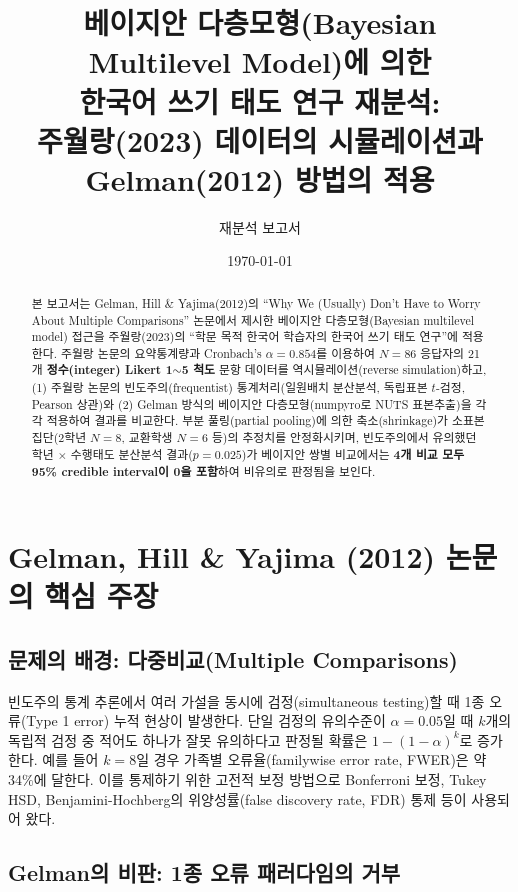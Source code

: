 \documentclass[11pt]{article}
\title{\textbf{베이지안 다층모형(Bayesian Multilevel Model)에 의한\\
한국어 쓰기 태도 연구 재분석:\\
주월랑(2023) 데이터의 시뮬레이션과 Gelman(2012) 방법의 적용}}
\author{재분석 보고서}
\date{\today}
\begin{document}
\maketitle

\begin{abstract}
\noindent
본 보고서는 Gelman, Hill \& Yajima(2012)의 ``Why We (Usually) Don't Have to Worry About Multiple Comparisons'' 논문에서 제시한 베이지안 다층모형(Bayesian multilevel model) 접근을 주월랑(2023)의 ``학문 목적 한국어 학습자의 한국어 쓰기 태도 연구''에 적용한다. 주월랑 논문의 요약통계량과 Cronbach's $\alpha=0.854$를 이용하여 $N=86$ 응답자의 21개 \textbf{정수(integer) Likert 1$\sim$5 척도} 문항 데이터를 역시뮬레이션(reverse simulation)하고, (1) 주월랑 논문의 빈도주의(frequentist) 통계처리(일원배치 분산분석, 독립표본 $t$-검정, Pearson 상관)와 (2) Gelman 방식의 베이지안 다층모형(numpyro로 NUTS 표본추출)을 각각 적용하여 결과를 비교한다. 부분 풀링(partial pooling)에 의한 축소(shrinkage)가 소표본 집단(2학년 $N=8$, 교환학생 $N=6$ 등)의 추정치를 안정화시키며, 빈도주의에서 유의했던 학년 $\times$ 수행태도 분산분석 결과($p=0.025$)가 베이지안 쌍별 비교에서는 \textbf{4개 비교 모두 95\% credible interval이 0을 포함}하여 비유의로 판정됨을 보인다.
\end{abstract}

\section{Gelman, Hill \& Yajima (2012) 논문의 핵심 주장}

\subsection{문제의 배경: 다중비교(Multiple Comparisons)}

빈도주의 통계 추론에서 여러 가설을 동시에 검정(simultaneous testing)할 때 1종 오류(Type 1 error) 누적 현상이 발생한다. 단일 검정의 유의수준이 $\alpha=0.05$일 때 $k$개의 독립적 검정 중 적어도 하나가 잘못 유의하다고 판정될 확률은 $1-(1-\alpha)^k$로 증가한다. 예를 들어 $k=8$일 경우 가족별 오류율(familywise error rate, FWER)은 약 $34\%$에 달한다. 이를 통제하기 위한 고전적 보정 방법으로 Bonferroni 보정, Tukey HSD, Benjamini-Hochberg의 위양성률(false discovery rate, FDR) 통제 등이 사용되어 왔다.

\subsection{Gelman의 비판: 1종 오류 패러다임의 거부}
\end{document}
